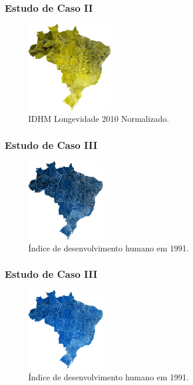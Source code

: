 \documentclass[aspectratio=169]{beamer}
\begin{document}
\begin{frame}
\frametitle{Estudo de Caso II}
\justifying

\begin{figure}
\centering
\includegraphics[width=0.33\textwidth]{images/longevidade-ampliado.png}
\caption{IDHM Longevidade 2010 Normalizado.}
\end{figure}

\end{frame}

\begin{frame}
\frametitle{Estudo de Caso III}
\justifying


\begin{figure}
\centering
\includegraphics[width=0.3\textwidth]{images/idh-1991.png}
\caption{Índice de desenvolvimento humano em 1991.}
\end{figure}

\end{frame}

\begin{frame}
\frametitle{Estudo de Caso III}
\justifying


\begin{figure}
\centering
\includegraphics[width=0.3\textwidth]{images/idh-2010.png}
\caption{Índice de desenvolvimento humano em 1991.}
\end{figure}

\end{frame}
\end{document}
